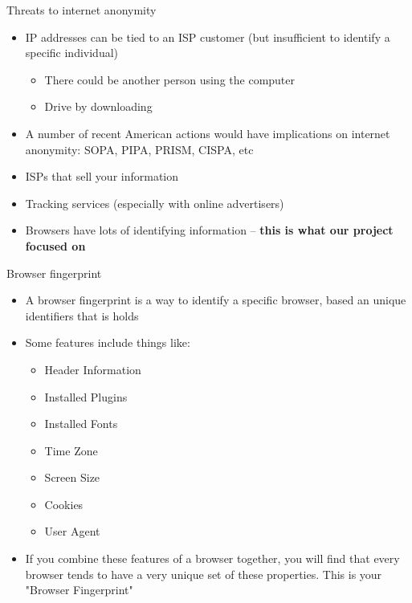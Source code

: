 \begin{frame}[fragile,t]{Threats to internet anonymity}
	\begin{itemize}
		\item IP addresses can be tied to an ISP customer (but insufficient to identify a specific individual)
		\begin{itemize}
			\item There could be another person using the computer
			\item Drive by downloading
		\end{itemize}
		\item A number of recent American actions would have implications on internet anonymity: SOPA, PIPA, PRISM, CISPA, etc
		\item ISPs that sell your information
		\item Tracking services (especially with online advertisers)
		\item Browsers have lots of identifying information -- \textbf{this is what our project focused on}
	\end{itemize}
\end{frame}

\begin{frame}[fragile,t]{Browser fingerprint}
	\begin{itemize}
		\item A browser fingerprint is a way to identify a specific browser, based an unique identifiers that is holds
		\item Some features include things like:
		\begin{itemize}
			\item Header Information
			\item Installed Plugins
			\item Installed Fonts
			\item Time Zone
			\item Screen Size
			\item Cookies
			\item User Agent
		\end{itemize}
		\item If you combine these features of a browser together, you will find that every browser tends to have a very unique set of these properties. This is your "Browser Fingerprint"
	\end{itemize}
	
\end{frame}

